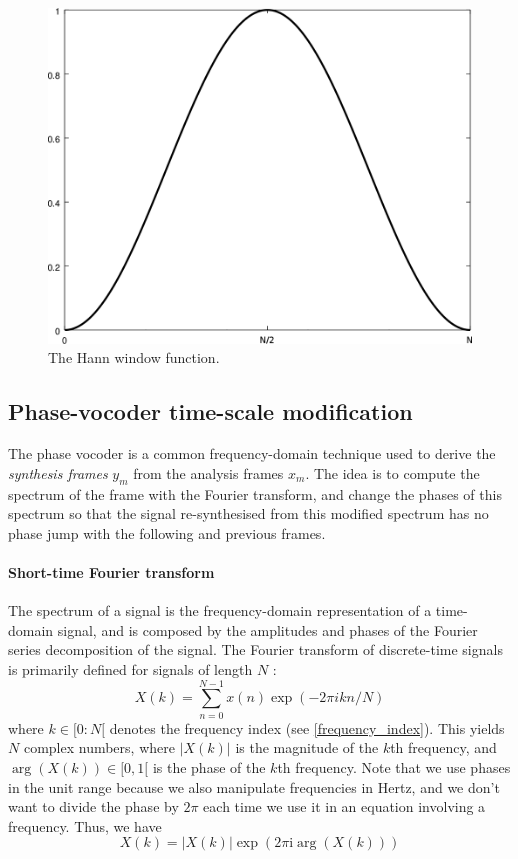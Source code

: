 \documentclass[letterpaper]{article}
\theoremstyle{definition}
\theoremstyle{remark}
\begin{document}
\begin{figure}[h]
\includegraphics[width=\linewidth]{hann.png}
\caption{The Hann window function.}
\end{figure}

\subsection{Phase-vocoder time-scale modification}
The phase vocoder is a common frequency-domain technique used to derive the
\emph{synthesis frames} \(y_m\)  from the analysis frames \(x_m\). The idea is
to compute the spectrum of the frame with the Fourier transform, and change the
phases of this spectrum so that the signal re-synthesised from this modified
spectrum has no phase jump with the following and previous frames.

\paragraph{Short-time Fourier transform}
The spectrum of a signal is the frequency-domain representation of a time-domain
signal, and is composed by the amplitudes and phases of the Fourier series
decomposition of the signal. The Fourier transform of discrete-time signals is
primarily defined for signals of length \(N\) \citep{bracewell1986fourier}:
\begin{equation}
	X(k) = \sum_{n=0}^{N-1}x(n)\exp(-2\pi ikn/N)
\end{equation}
where \(k\in [0:N[\) denotes the frequency index (see \eqref{frequency_index}).
This yields \(N\) complex numbers, where \(|X(k)|\) is the magnitude of the
\(k\)th frequency, and \(\arg(X(k))\in[0,1[\) is the phase of the \(k\)th
frequency. Note that we use phases in the unit range because we also manipulate
frequencies in Hertz, and we don't want to divide the phase by \(2\pi\) each
time we use it in an equation involving a frequency. Thus, we have
\begin{equation}
	X(k)= |X(k)|\exp(2\pi \text{i} \arg(X(k)))
\end{equation}
\end{document}
